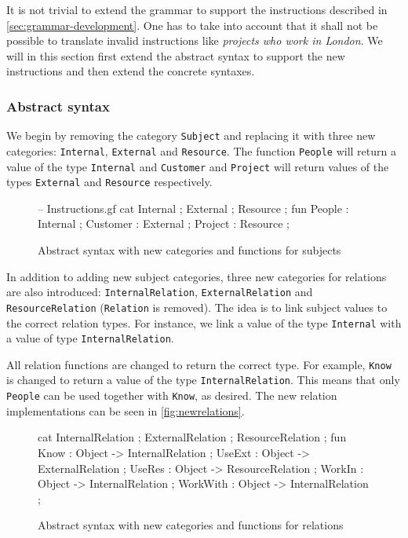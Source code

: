 It is not trivial to extend the grammar to support the instructions described in \autoref{sec:grammar-development}. One has to take into account that it shall not be possible to translate invalid instructions like \emph{projects who work in London}. We will in this section first extend the abstract syntax to support the new instructions and then extend the concrete syntaxes.

\subsubsection*{Abstract syntax}
We begin by removing the category \texttt{Subject} and replacing it with three new categories: \texttt{Internal}, \texttt{External} and \texttt{Resource}. The function \texttt{People} will return a value of the type \texttt{Internal} and \texttt{Customer} and \texttt{Project} will return values of the types \texttt{External} and \texttt{Resource} respectively.

\begin{figure}[H]
\begin{code}
-- Instructions.gf
cat
  Internal ;
  External ;
  Resource ;
fun
  People   : Internal ;
  Customer : External ;
  Project  : Resource ;
\end{code}
\caption{Abstract syntax with new categories and functions for subjects}
\end{figure}

In addition to adding new subject categories, three new categories for relations are also introduced: \texttt{InternalRelation}, \texttt{ExternalRelation} and \texttt{ResourceRelation} (\texttt{Relation} is removed). The idea is to link subject values to the correct relation types. For instance, we link a value of the type \texttt{Internal} with a value of type \texttt{InternalRelation}.

All relation functions are changed to return the correct type. For example, \texttt{Know} is changed to return a value of the type \texttt{InternalRelation}. This means that only \texttt{People} can be used together with \texttt{Know}, as desired. The new relation implementations can be seen in \autoref{fig:newrelations}.

\begin{figure}[H]
\begin{code}
cat
  InternalRelation ;
  ExternalRelation ;
  ResourceRelation ;
fun
  Know     : Object -> InternalRelation ;
  UseExt   : Object -> ExternalRelation ;
  UseRes   : Object -> ResourceRelation ;
  WorkIn   : Object -> InternalRelation ;
  WorkWith : Object -> InternalRelation ;
\end{code}
\caption{Abstract syntax with new categories and functions for relations \label{fig:newrelations}}
\end{figure}

